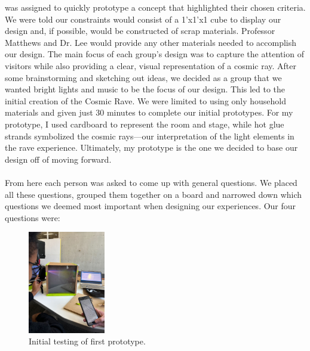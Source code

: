 \documentclass{article}
\begin{document}
was assigned to quickly prototype a concept that highlighted their chosen criteria. We were told our constraints would consist of a 1'x1'x1 cube to display our design and, if possible, would be constructed of scrap materials. Professor Matthews and Dr. Lee would provide any other materials needed to accomplish our design. The main focus of each group's design was to capture the attention of visitors while also providing a clear, visual representation of a cosmic ray. After some brainstorming and sketching out ideas, we decided as a group that we wanted bright lights and music to be the focus of our design. This led to the initial creation of the Cosmic Rave. We were limited to 
using only household materials and given just 30 
minutes to complete our initial prototypes. For my prototype, I used cardboard to represent the room and stage, while 
hot glue strands symbolized the cosmic rays—our interpretation of the light elements in the rave experience. Ultimately, my prototype is the one we decided to base our design off of moving forward. 
\\\\
From here each person was asked to come up with general questions. We placed all these questions, grouped them together on a board and narrowed down which questions we deemed most important when designing our experiences. Our four questions were: 
\begin{figure}
  \begin{center}
    \includegraphics[width=0.3\textwidth]{6}
  \end{center}
  \caption{Initial testing of first prototype.}
\end{figure}
\end{document}
